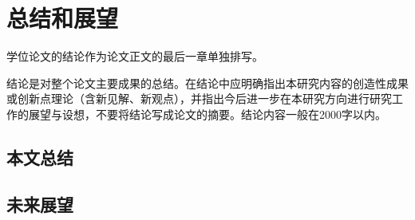 

\chapter{总结和展望 }
学位论文的结论作为论文正文的最后一章单独排写。

结论是对整个论文主要成果的总结。在结论中应明确指出本研究内容的创造性成果或创新点理论（含新见解、新观点），并指出今后进一步在本研究方向进行研究工作的展望与设想，不要将结论写成论文的摘要。结论内容一般在2000字以内。

\section{本文总结}
 
\section{未来展望}
 




